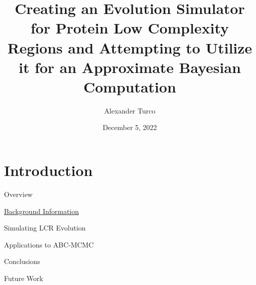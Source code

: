 \documentclass{beamer}
\title[BEAP Dec 2022]{Creating an Evolution Simulator for Protein Low Complexity Regions and Attempting to Utilize it for an Approximate Bayesian Computation}
\author{Alexander Turco}
\date{December 5, 2022}
\begin{document}
	
	\section{Introduction}
	\begin{frame}
		\titlepage 
	\end{frame}
	
	\logo{}
	
	\begin{frame}{Overview}
		
		\begin{center}
		\begin{minipage}{6cm}
				
		  		\begin{block}{} \hyperlink{link1}{Background Information} \end{block}
		  		\begin{block}{} Simulating LCR Evolution \end{block}
		  		\begin{block}{} Applications to ABC-MCMC \end{block}
		  		\begin{block}{} Conclusions \end{block}
		  		\begin{block}{} Future Work \end{block}

		\end{minipage}
		\end{center}
	
	\end{frame}
	
\end{document}
